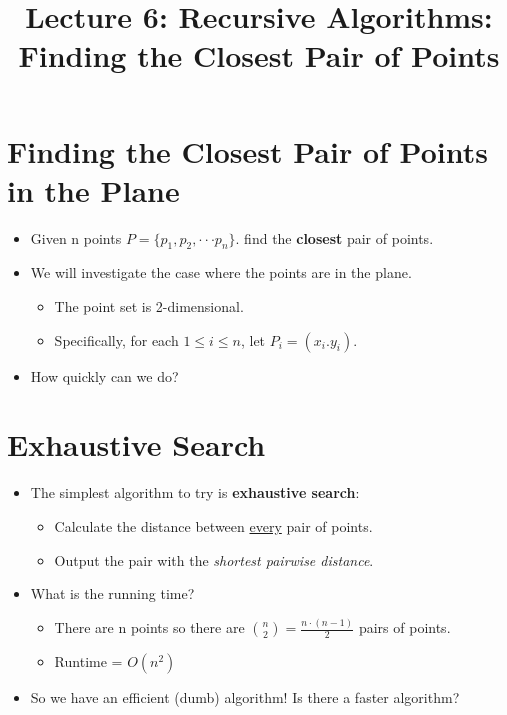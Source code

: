 \documentclass[12pt]{article}
\title{\huge Lecture 6: Recursive Algorithms: Finding the Closest Pair of Points}
\author{}
\date{}
\begin{document}
\maketitle
\section{Finding the Closest Pair of Points in the Plane}
\renewcommand{\labelitemii}{$\circ$}
\renewcommand{\labelitemiii}{$\cdot$}
\renewcommand{\labelitemiii}{$\rightarrow$}
\renewcommand{\labelitemiv}{$\star$}
\begin{itemize}
\item Given n points $P = \{p_1, p_2, \cdot \cdot \cdot p_n\}$. find the \textbf{closest} pair of points.
\item We will investigate the case where the points are in the plane.
	\begin{itemize}
	\item The point set is 2-dimensional.
	\item Specifically, for each $1 \leq i \leq n$, let $P_i = (x_i. y_i)$.
	\end{itemize}
\item How quickly can we do?
\end{itemize}

\section{Exhaustive Search}
\renewcommand{\labelitemii}{$\circ$}
\renewcommand{\labelitemiii}{$\cdot$}
\renewcommand{\labelitemiii}{$\rightarrow$}
\renewcommand{\labelitemiv}{$\star$}
\begin{itemize}
\item The simplest algorithm to try is \textbf{exhaustive search}:
	\begin{itemize}
	\item Calculate the distance between \underline{every} pair of points.
	\item Output the pair with the \textit{shortest pairwise distance}. 
	\end{itemize}
\item What is the running time?
	\begin{itemize}
	\item There are n points so there are {\large $\binom{n}{2} = \frac{n \cdot (n - 1)}{2}$} pairs of points.
	\item Runtime = $O(n^2)$
	\end{itemize}
\item So we have an efficient (dumb) algorithm! Is there a faster algorithm?
\end{itemize}
\end{document}
